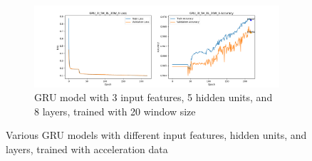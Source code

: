 \documentclass{article}
\begin{document}
\begin{figure}[ht]
\begin{subfigure}
            \label{fig:GRU_3I_5H_4L_20W_A_GRAPH}
        \end{subfigure}
        \begin{subfigure}
            {\textwidth}
            \centering
            \includegraphics[width=\textwidth]{GRU_3I_5H_8L_20W_A_GRAPH.png}
            \caption{GRU model with 3 input features, 5 hidden units, and 8
            layers, trained with 20 window size}
            \label{fig:GRU_3I_5H_8L_20W_A_GRAPH}
        \end{subfigure}
        \caption{Various GRU models with different input features, hidden units,
        and layers, trained with acceleration data}
        \label{fig:GRU_3I_5H}
    \end{figure}
\end{document}
